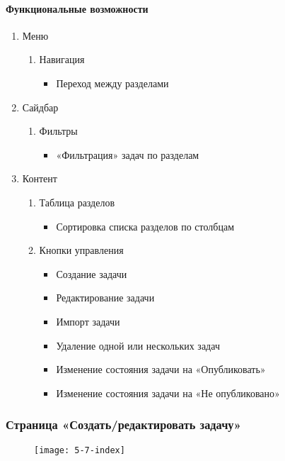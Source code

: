 \paragraph{Функциональные возможности}
\begin{enumerate}
	\item Меню
	\begin{enumerate}
		\item Навигация
		\begin{itemize}
			\item Переход между разделами
		\end{itemize}
	\end{enumerate}

	\item Сайдбар
	\begin{enumerate}
		\item Фильтры
		\begin{itemize}
			\item «Фильтрация» задач по разделам
		\end{itemize}
	\end{enumerate}

	\item Контент
	\begin{enumerate}
		\item Таблица разделов
		\begin{itemize}
			\item Сортировка списка разделов по столбцам
		\end{itemize}

		\item Кнопки управления
		\begin{itemize}
			\item Создание задачи
			\item Редактирование задачи
			\item Импорт задачи
			\item Удаление одной или нескольких задач
			\item Изменение состояния задачи на «Опубликовать»
			\item Изменение состояния задачи на «Не опубликовано»
		\end{itemize}
	\end{enumerate}
\end{enumerate}

\subsubsection{Страница «Создать/редактировать задачу»}
\begin{figure}[H]
	\texttt{[image: 5-7-index]}
\end{figure}
